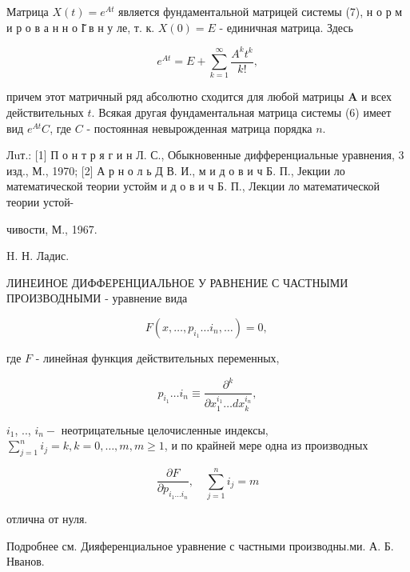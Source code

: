 \documentclass[10pt]{article}
\begin{document}
Матрица $X(t)=e^{A t}$ является фундаментальной матрицей системы (7), н о р м и р о в а н н о І̆ в н у ле, т. к. $X(0)=E$ - единичная матрица. Здесь



\[

e^{A t}=E+\sum_{k=1}^{\infty} \frac{A^{k} t^{k}}{k !},

\]



причем этот матричный ряд абсолютно сходится для любой матрицы $\boldsymbol{A}$ и всех действительных $t$. Всякая другая фундаментальная матрица системы (6) имеет вид $e^{A t} C$, где $C$ - постоянная невырожденная матрица порядка $n$.



Лuт.: [1] П о н т р я г и н Л. С., Обыкновенные дифференциальные уравнения, 3 изд., М., 1970; [2] А р н о л ь Д В. И., м и д о в и ч Б. П., Јекции ло математической теории устойм и д о в и ч Б. П., Лекции ло математической теории устой-

чивости, М., 1967.

H. Н. Ладис.



ЛИНЕИНОЕ ДИФФЕРЕНЦИАЛЬНОЕ У РАВНЕНИЕ С ЧАСТНЫМИ ПРОИЗВОДНЫМИ - уравнение вида



\[

F\left(x, \ldots, p_{i_{1}} \ldots i_{n}, \ldots\right)=0 \text {, }

\]



где $F$ - линейная функция действительных переменных,



\[

p_{i_{1}} \ldots i_{n} \equiv \frac{\partial^{k}}{\partial x_{1}^{i_{1}} \ldots d x_{k}^{i_{n}}},

\]



$i_{1}$, .., $i_{n}-$ неотрицательные целочисленные индексы, $\sum_{j=1}^{n} i_{j}=k, k=0, \ldots, m, m \geqslant 1$, и по крайней мере одна из производных



\[

\frac{\partial F}{\partial p_{i_{1} \ldots i_{n}}}, \quad \sum_{j=1}^{n} i_{j}=m

\]



отлична от нуля.



Подробнее см. Дияференциальное уравнение с частными производны.ми. А. Б. Нванов.
\end{document}
